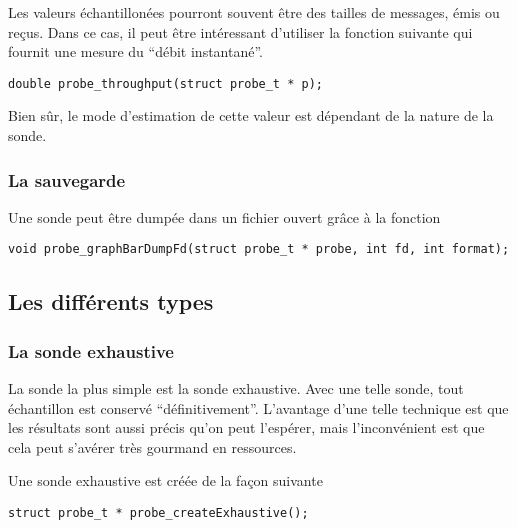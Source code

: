    Les valeurs échantillonées pourront souvent être des tailles de
messages, émis ou reçus. Dans ce cas, il peut être intéressant
d'utiliser la fonction suivante qui fournit une mesure du ``débit
instantané''.

\begin{verbatim}
double probe_throughput(struct probe_t * p);
\end{verbatim}

   Bien sûr, le mode d'estimation de cette valeur est dépendant de la
nature de la sonde.
%
\subsubsection{La sauvegarde}

   Une sonde peut être dumpée dans un fichier ouvert grâce à la
fonction

{\tt void probe\_graphBarDumpFd(struct probe\_t * probe, int fd, int
format);}

%
\subsection{Les différents types}

%
\subsubsection{La sonde exhaustive}

   La sonde la plus simple est la sonde exhaustive. Avec une telle
sonde, tout échantillon est conservé ``définitivement''. L'avantage
d'une telle technique est que les résultats sont aussi précis qu'on
peut l'espérer, mais l'inconvénient est que cela peut s'avérer très
gourmand en ressources.

   Une sonde exhaustive est créée de la façon suivante

\begin{verbatim}
struct probe_t * probe_createExhaustive();  
\end{verbatim}

